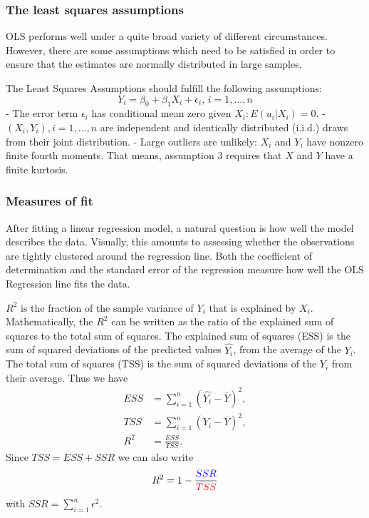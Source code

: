 \documentclass[
  12pt,
  oneside]{book}
\theoremstyle{definition}
\theoremstyle{definition}
\theoremstyle{definition}
\theoremstyle{definition}
\theoremstyle{remark}
\begin{document}
\hypertarget{the-least-squares-assumptions}{%
\subsubsection{The least squares assumptions}\label{the-least-squares-assumptions}}

OLS performs well under a quite broad variety of different circumstances. However, there are some assumptions which need to be satisfied in order to ensure that the estimates are normally distributed in large samples.

The Least Squares Assumptions should fulfill the following assumptions:
\[Y_i = \beta_0 + \beta_1 X_i + \epsilon_i \text{, } i = 1,\dots,n\]
- The error term \(\epsilon_i\) has conditional mean zero given \(X_i: E(u_i|X_i)=0\).
- \((X_i,Y_i), i=1,\dots,n\) are independent and identically distributed (i.i.d.) draws from their joint distribution.
- Large outliers are unlikely: \(X_i\) and \(Y_i\) have nonzero finite fourth moments. That means, assumption 3 requires that \(X\) and \(Y\) have a finite kurtosis.

\hypertarget{measures-of-fit}{%
\subsubsection{Measures of fit}\label{measures-of-fit}}

After fitting a linear regression model, a natural question is how well the model describes the data. Visually, this amounts to assessing whether the observations are tightly clustered around the regression line. Both the coefficient of determination and the standard error of the regression measure how well the OLS Regression line fits the data.

\(R^2\) is the fraction of the sample variance of \(Y_i\) that is explained by \(X_i\). Mathematically, the \(R^2\) can be written as the ratio of the explained sum of squares to the total sum of squares. The explained sum of squares (ESS) is the sum of squared deviations of the predicted values \(\hat{Y_i}\), from the average of the \(Y_i\). The total sum of squares (TSS) is the sum of squared deviations of the \(Y_i\) from their average. Thus we have
\begin{align}
ESS & =  \sum_{i = 1}^n \left( \hat{Y_i} - \overline{Y} \right)^2,   \\
TSS & =  \sum_{i = 1}^n \left( Y_i - \overline{Y} \right)^2,   \\
R^2 & = \frac{ESS}{TSS}.
\end{align}
Since \(TSS = ESS + SSR\) we can also write
\[R^2 = 1- \frac{\textcolor{blue}{SSR}}{\textcolor{red}{TSS}}\]
with \(SSR= \sum_{i = 1}^n \epsilon^2\).
\end{document}
